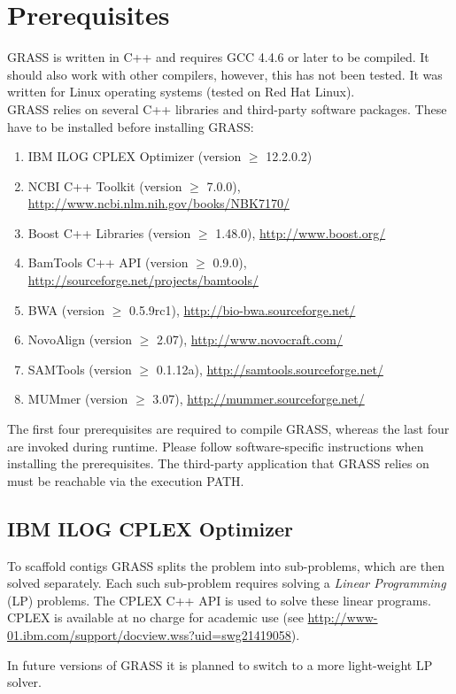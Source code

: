 \documentclass[12pt, a4paper]{report}
\begin{document}
\section{Prerequisites}
GRASS is written in C++ and requires GCC 4.4.6 or later to be compiled. It should also work with other compilers, however, this has not been tested. It was written for Linux operating systems (tested on Red Hat Linux).\\
GRASS relies on several C++ libraries and third-party software packages. These have to be installed before installing GRASS:
\begin{enumerate}
\item IBM ILOG CPLEX Optimizer (version $\geq$ 12.2.0.2)
\item NCBI C++ Toolkit (version $\geq$ 7.0.0), \url{http://www.ncbi.nlm.nih.gov/books/NBK7170/}
\item Boost C++ Libraries (version $\geq$ 1.48.0), \url{http://www.boost.org/}
\item BamTools C++ API (version $\geq$ 0.9.0), \url{http://sourceforge.net/projects/bamtools/}
\item BWA (version $\geq$ 0.5.9rc1), \url{http://bio-bwa.sourceforge.net/}
\item NovoAlign (version $\geq$ 2.07), \url{http://www.novocraft.com/}
\item SAMTools (version $\geq$ 0.1.12a), \url{http://samtools.sourceforge.net/}
\item MUMmer (version $\geq$ 3.07), \url{http://mummer.sourceforge.net/}
\end{enumerate}

The first four prerequisites are required to compile GRASS, whereas the last four are invoked during runtime. Please follow software-specific instructions when installing the prerequisites. The third-party application that GRASS relies on must be reachable via the execution PATH.

\subsection{IBM ILOG CPLEX Optimizer}
To scaffold contigs GRASS splits the problem into sub-problems, which are then solved separately. Each such sub-problem requires solving a \emph{Linear Programming} (LP) problems. The CPLEX C++ API is used to solve these linear programs. CPLEX is available at no charge for academic use (see \url{http://www-01.ibm.com/support/docview.wss?uid=swg21419058}).

In future versions of GRASS it is planned to switch to a more light-weight LP solver.
\end{document}

